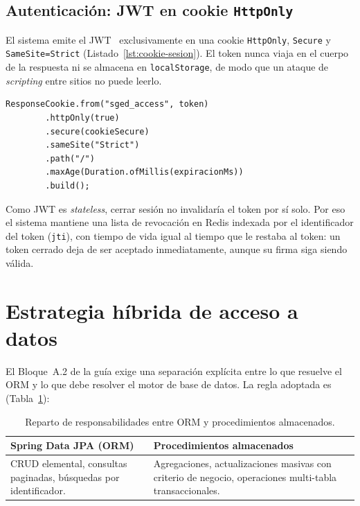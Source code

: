 \documentclass[11pt,a4paper]{article}
\newcommand{\ruta}[1]{\texttt{\footnotesize #1}}
\begin{document}
\subsection{Autenticación: JWT en cookie \texttt{HttpOnly}}
\label{sec:jwt-cookie}

El sistema emite el JWT~\cite{rfc7519} exclusivamente en una cookie
\texttt{HttpOnly}, \texttt{Secure} y \texttt{SameSite=Strict}
(Listado~\ref{lst:cookie-sesion}). El token nunca
viaja en el cuerpo de la respuesta ni se almacena en \texttt{localStorage},
de modo que un ataque de \emph{scripting} entre sitios no puede leerlo.

\begin{lstlisting}[caption={Emisión de la cookie de sesión (\ruta{AuthController.java})},label={lst:cookie-sesion}]
ResponseCookie.from("sged_access", token)
        .httpOnly(true)
        .secure(cookieSecure)
        .sameSite("Strict")
        .path("/")
        .maxAge(Duration.ofMillis(expiracionMs))
        .build();
\end{lstlisting}

Como JWT es \emph{stateless}, cerrar sesión no invalidaría el token por sí
solo. Por eso el sistema mantiene una lista de revocación en Redis indexada
por el identificador del token (\texttt{jti}), con tiempo de vida igual al
tiempo que le restaba al token: un token cerrado deja de ser aceptado
inmediatamente, aunque su firma siga siendo válida.

\section{Estrategia híbrida de acceso a datos}
\label{sec:acceso-datos}

El Bloque~A.2 de la guía exige una separación explícita entre lo que resuelve
el ORM y lo que debe resolver el motor de base de datos. La regla adoptada
es (Tabla~\ref{tab:reparto-orm-sp}):

\begin{table}[htbp]
\centering
\caption{Reparto de responsabilidades entre ORM y procedimientos almacenados.}
\label{tab:reparto-orm-sp}
\begin{tabular}{@{}p{7.3cm}p{7.3cm}@{}}
\toprule
\textbf{Spring Data JPA (ORM)} & \textbf{Procedimientos almacenados} \\
\midrule
CRUD elemental, consultas paginadas, búsquedas por identificador. &
Agregaciones, actualizaciones masivas con criterio de negocio, operaciones
multi-tabla transaccionales. \\
\bottomrule
\end{tabular}
\end{table}
\end{document}
